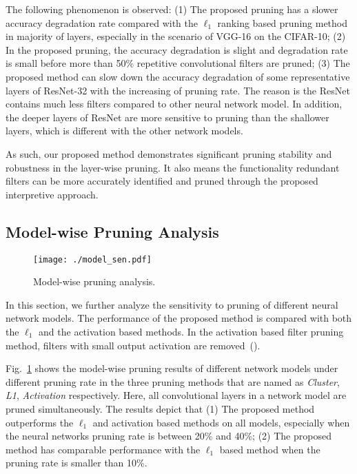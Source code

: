 \documentclass{article} %
\begin{document}
The following phenomenon is observed:
(1) The proposed pruning has a slower accuracy degradation rate compared with the $\ell_1$ ranking based pruning method in majority of layers, especially in the scenario of VGG-16 on the CIFAR-10;
(2) In the proposed pruning, the accuracy degradation is slight and degradation rate is small before more than 50\% repetitive convolutional filters are pruned;
(3) The proposed method can slow down the accuracy degradation of some representative layers of ResNet-32 with the increasing of pruning rate.
The reason is the ResNet contains much less filters compared to other neural network model.
In addition, the deeper layers of ResNet are more sensitive to pruning than the shallower layers, which is different with the other network models.


As such, our proposed method demonstrates significant pruning stability and robustness in the layer-wise pruning.
It also means the functionality redundant filters can be more accurately identified and pruned through the proposed interpretive approach.

\subsection{Model-wise Pruning Analysis}\begin{figure}[b]
  \centering
  \texttt{[image: ./model\_sen.pdf]}
  \caption{Model-wise pruning analysis.}
  \label{fig:model}
  \vspace{-2mm}
\end{figure}

In this section, we further analyze the sensitivity to pruning of different neural network models.
The performance of the proposed method is compared with both the $\ell_1$ and the activation based methods.
In the activation based filter pruning method, filters with small output activation are removed~(\cite{polyak2015channel}).

Fig.~\ref{fig:model} shows the model-wise pruning results of different network models under different pruning rate in the three pruning methods that are named as \emph{Cluster}, \emph{L1}, \emph{Activation} respectively.
Here, all convolutional layers in a network model are pruned simultaneously.
The results depict that
(1) The proposed method outperforms the $\ell_1$ and activation based methods on all models, especially when the neural networks pruning rate is between 20\% and 40\%;
(2) The proposed method has comparable performance with the $\ell_1$ based method when the pruning rate is smaller than 10\%.
\end{document}
